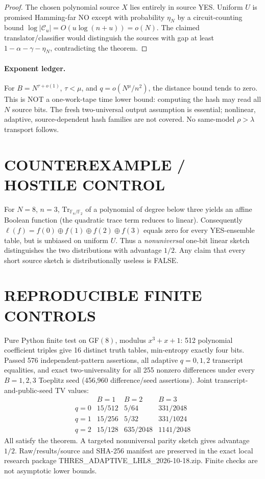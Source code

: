 \documentclass[11pt]{article}
\begin{document}
\begin{proof}
The chosen polynomial source $X$ lies entirely in source YES. Uniform $U$ is promised Hamming-far NO except with probability $\eta_N$ by a circuit-counting bound $\log|\mathcal C_u|=O(u\log(n+u))=o(N)$. The claimed translator/classifier would distinguish the sources with gap at least $1-\alpha-\gamma-\eta_N$, contradicting the theorem.
\end{proof}
\paragraph{Exponent ledger.}
For $B=N^{\tau+o(1)}$, $\tau<\mu$, and $q=o(N^\mu/n^2)$, the distance bound tends to zero. This is NOT a one-work-tape time lower bound: computing the hash may read all $N$ source bits. The fresh two-universal output assumption is essential; nonlinear, adaptive, source-dependent hash families are not covered. No same-model $\rho>\lambda$ transport follows.
\section*{COUNTEREXAMPLE / HOSTILE CONTROL}
For $N=8$, $n=3$, $\mathrm{Tr}_{\mathbb F_8/\mathbb F_2}$ of a polynomial of degree below three yields an affine Boolean function (the quadratic trace term reduces to linear). Consequently $\ell(f)=f(0)\oplus f(1)\oplus f(2)\oplus f(3)$ equals zero for every YES-ensemble table, but is unbiased on uniform $U$. Thus a \emph{nonuniversal} one-bit linear sketch distinguishes the two distributions with advantage $1/2$. Any claim that every short source sketch is distributionally useless is FALSE.
\section*{REPRODUCIBLE FINITE CONTROLS}
Pure Python finite test on GF$(8)$, modulus $x^3+x+1$: 512 polynomial coefficient triples give 16 distinct truth tables, min-entropy exactly four bits. Passed 576 independent-pattern assertions, all adaptive $q=0,1,2$ transcript equalities, and exact two-universality for all 255 nonzero differences under every $B=1,2,3$ Toeplitz seed (456,960 difference/seed assertions). Joint transcript-and-public-seed TV values:
\[
\begin{array}{c|ccc}
 & B=1&B=2&B=3\\\hline
q=0&15/512&5/64&331/2048\\
q=1&15/256&5/32&331/1024\\
q=2&15/128&635/2048&1141/2048
\end{array}
\]
All satisfy the theorem. A targeted nonuniversal parity sketch gives advantage $1/2$. Raw/results/source and SHA-256 manifest are preserved in the exact local research package THRES\_ADAPTIVE\_LHL8\_2026-10-18.zip. Finite checks are not asymptotic lower bounds.
\end{document}
